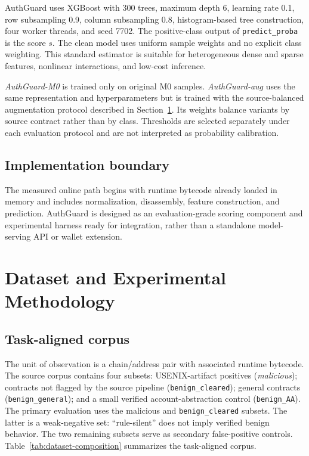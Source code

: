 \documentclass[conference]{IEEEtran}
\begin{document}
AuthGuard uses XGBoost with 300 trees, maximum depth 6, learning rate 0.1, row subsampling 0.9, column subsampling 0.8, histogram-based tree construction, four worker threads, and seed 7702. The positive-class output of \texttt{predict\_proba} is the score $s$. The clean model uses uniform sample weights and no explicit class weighting. This standard estimator is suitable for heterogeneous dense and sparse features, nonlinear interactions, and low-cost inference.

\emph{AuthGuard-M0} is trained only on original M0 samples. \emph{AuthGuard-aug} uses the same representation and hyperparameters but is trained with the source-balanced augmentation protocol described in Section~\ref{sec:methodology}. Its weights balance variants by source contract rather than by class. Thresholds are selected separately under each evaluation protocol and are not interpreted as probability calibration.

\subsection{Implementation boundary}

The measured online path begins with runtime bytecode already loaded in memory and includes normalization, disassembly, feature construction, and prediction. AuthGuard is designed as an evaluation-grade scoring component and experimental harness ready for integration, rather than a standalone model-serving API or wallet extension.

\section{Dataset and Experimental Methodology}
\label{sec:methodology}

\subsection{Task-aligned corpus}

The unit of observation is a chain/address pair with associated runtime bytecode. The source corpus contains four subsets: USENIX-artifact positives (\emph{malicious}); contracts not flagged by the source pipeline (\texttt{benign\_cleared}); general contracts (\texttt{benign\_general}); and a small verified account-abstraction control (\texttt{benign\_AA}). The primary evaluation uses the malicious and \texttt{benign\_cleared} subsets. The latter is a weak-negative set: ``rule-silent'' does not imply verified benign behavior. The two remaining subsets serve as secondary false-positive controls. Table~\ref{tab:dataset-composition} summarizes the task-aligned corpus.
\end{document}
